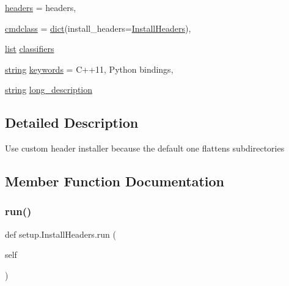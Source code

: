 \begin{DoxyCompactItemize}
\item 
\mbox{\hyperlink{classsetup_1_1_install_headers_a137e0496fd6faff035d41d1f61ac1433}{headers}} = headers,
\item 
\mbox{\hyperlink{classsetup_1_1_install_headers_a007c29260e732a654dcef080ff0884c8}{cmdclass}} = \mbox{\hyperlink{classdict}{dict}}(install\+\_\+headers=\mbox{\hyperlink{classsetup_1_1_install_headers}{Install\+Headers}}),
\item 
\mbox{\hyperlink{classlist}{list}} \mbox{\hyperlink{classsetup_1_1_install_headers_aebab67b564b4a0b845f0e5d692dc5408}{classifiers}}
\item 
\mbox{\hyperlink{asdl_8h_ae84541b4f3d8e1ea24ec0f466a8c568b}{string}} \mbox{\hyperlink{classsetup_1_1_install_headers_a2470571a3d7ee3b74be635ccc224414f}{keywords}} = \textquotesingle{}C++11, Python bindings\textquotesingle{},
\item 
\mbox{\hyperlink{asdl_8h_ae84541b4f3d8e1ea24ec0f466a8c568b}{string}} \mbox{\hyperlink{classsetup_1_1_install_headers_a8d17c057e121f10b6c6fcad35aa482e4}{long\+\_\+description}}
\end{DoxyCompactItemize}


\subsection{Detailed Description}
\begin{DoxyVerb}Use custom header installer because the default one flattens subdirectories\end{DoxyVerb}
 

\subsection{Member Function Documentation}
\mbox{\label{classsetup_1_1_install_headers_ae3939ef9299e7b4d7c2ed0614eef557a}} 
\subsubsection{\texorpdfstring{run()}{run()}}
{\footnotesize\ttfamily def setup.\+Install\+Headers.\+run (\begin{DoxyParamCaption}\item[{}]{self }\end{DoxyParamCaption})}



